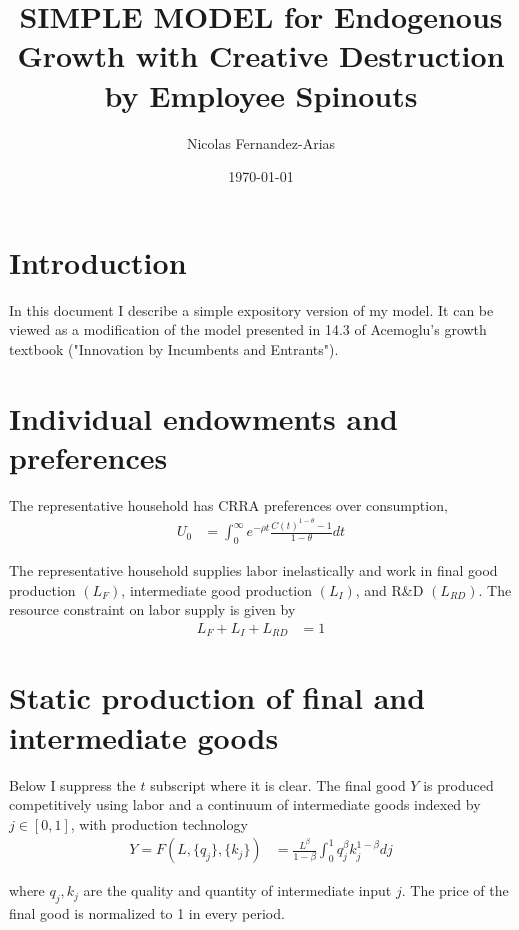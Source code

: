 \documentclass[12pt,english]{article}
\theoremstyle{remark}
\begin{document}
	
\title{SIMPLE MODEL for Endogenous Growth with Creative Destruction by Employee Spinouts}
\author{Nicolas Fernandez-Arias}
\date{\today}
\maketitle

\section{Introduction}

In this document I describe a simple expository version of my model.  It can be viewed as a modification of the model presented in 14.3 of Acemoglu's growth textbook ("Innovation by Incumbents and Entrants").

\section{Individual endowments and preferences}

The representative household has CRRA preferences over consumption, 
\begin{align}
U_0 &= \int_0^{\infty} e^{-\rho t} \frac{C(t)^{1-\theta} - 1}{1-\theta} dt \label{preferences}
\end{align}

The representative household supplies labor inelastically and work in final good production $(L_F)$, intermediate good production $(L_I)$, and R\&D $(L_{RD})$. The resource constraint on labor supply is given by
\begin{align}
L_F + L_I + L_{RD} &= 1 \label{labor_resource_constraint}
\end{align}


\section{Static production of final and intermediate goods}

Below I suppress the $t$ subscript where it is clear. The final good $Y$ is produced competitively using labor and a continuum of intermediate goods indexed by $j \in [0,1]$, with production technology
\begin{align}
Y = F(L,\{q_j\},\{k_j\}) &= \frac{L^{\beta}}{1-\beta} \int_0^1 q_j^{\beta} k_j^{1-\beta} dj \label{final_goods_production}
\end{align}

where $q_j,k_j$ are the quality and quantity of intermediate input $j$. 
The price of the final good is normalized to 1 in every period. 
\end{document}
